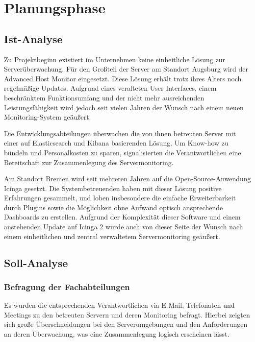 \section{Planungsphase} 
\label{sec:Planungsphase}

\subsection{Ist-Analyse} 
\label{sec:IstAnalyse}
Zu Projektbeginn existiert im Unternehmen keine einheitliche Lösung zur Serverüberwachung. Für den Großteil der Server am Standort Augsburg wird der \glqq Advanced Host Monitor\grqq{} eingesetzt. Diese Lösung erhält trotz ihres Alters noch regelmäßige Updates. Aufgrund eines veralteten User Interfaces, einem beschränktem Funktionsumfang und der nicht mehr ausreichenden Leistungsfähigkeit wird jedoch seit vielen Jahren der Wunsch nach einem neuen Monitoring-System geäußert.

Die Entwicklungsabteilungen überwachen die von ihnen betreuten Server mit einer auf \glqq Elasticsearch\grqq{} und \glqq Kibana\grqq{} basierenden Lösung. Um Know-how zu bündeln und Personalkosten zu sparen, signalisierten die Verantwortlichen eine Bereitschaft zur Zusammenlegung des Servermonitoring.

Am Standort Bremen wird seit mehreren Jahren auf die Open-Source-Anwendung \glqq Icinga\grqq{} gesetzt. Die Systembetreuenden haben mit dieser Lösung positive Erfahrungen gesammelt, und loben insbesondere die einfache Erweiterbarkeit durch Plugins sowie die Möglichkeit ohne Aufwand optisch ansprechende Dashboards zu erstellen. Aufgrund der Komplexität dieser Software und einem anstehenden Update auf \glqq Icinga 2\grqq{} wurde auch von dieser Seite der Wunsch nach einem einheitlichen und zentral verwaltetem Servermonitoring geäußert.

\subsection{Soll-Analyse} 
\label{sec:SollAnalyse}

\subsubsection{Befragung der Fachabteilungen}
\label{sec:BefragungFachabteilungen}
Es wurden die entsprechenden Verantwortlichen via E-Mail, Telefonaten und Meetings zu den betreuten Servern und deren Monitoring befragt. Hierbei zeigten sich große Überschneidungen bei den Serverumgebungen und den Anforderungen an deren Überwachung, was eine Zusammenlegung logisch erscheinen lässt.

